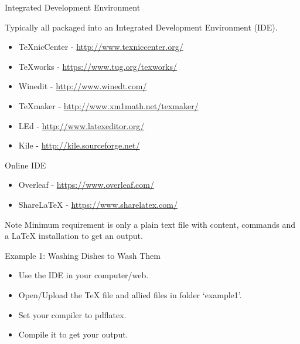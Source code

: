 \documentclass{beamer}
\begin{document}
\begin{frame}{Integrated Development Environment}

Typically all packaged into an Integrated Development Environment (IDE).

\begin{itemize}
 \item \TeX nicCenter - \url{http://www.texniccenter.org/}
 \item \TeX works - \url{https://www.tug.org/texworks/}
 \item Winedit - \url{http://www.winedt.com/}
 \item \TeX maker - \url{http://www.xm1math.net/texmaker/}
 \item LEd - \url{http://www.latexeditor.org/}
 \item Kile - \url{http://kile.sourceforge.net/}
\end{itemize}

Online IDE
\begin{itemize}
 \item Overleaf - \url{https://www.overleaf.com/}
 \item Share\LaTeX{} - \url{https://www.sharelatex.com/}
\end{itemize}

\begin{block}{Note}
Minimum requirement is only a plain text file with content, commands 
and a \LaTeX{} installation to get an output.
\end{block}

\end{frame}

\begin{frame}[fragile]{Example 1: Washing Dishes to Wash Them}
 
 \begin{itemize}
  \item Use the IDE in your computer/web. 
  \item Open/Upload the \TeX{} file and allied files in folder `example1'.
  \item Set your compiler to pdflatex.
  \item Compile it to get your output. 
 \end{itemize}
\end{frame}
 
\end{document}
